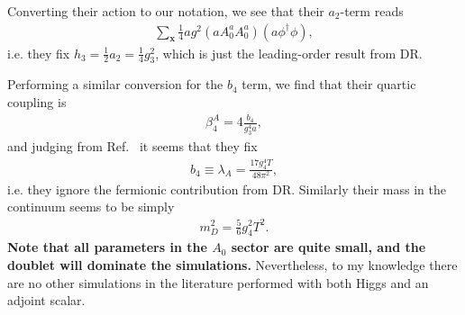 \documentclass[11pt,a4paper]{article}
\begin{document}
Converting their action to our notation, we see that their $a_2$-term reads 
\begin{align}
\sum_{\textbf{x}} \frac14 a g^2 (a A^a_0 A^a_0) (a \phi^\dagger\phi),
\end{align}
i.e. they fix $h_3 = \frac12 a_2 = \frac14 g_3^2$, which is just the leading-order result from DR.

Performing a similar conversion for the $b_4$ term, we find that their quartic coupling is
\begin{align*}
\beta^A_4 = 4 \frac{b_4}{g^4_3 a},
\end{align*}
and judging from Ref.~\cite{Farakos:1994kx} it seems that they fix 
\begin{align}
b_4 \equiv \lambda_A = \frac{17 g_4^4 T}{48\pi^2},
\end{align}
i.e. they ignore the fermionic contribution from DR. Similarly their mass in the continuum seems to be simply 
\begin{align}
m^2_D = \frac56 g^2_4 T^2. 
\end{align}
\textbf{Note that all parameters in the $A_0$ sector are quite small, and the doublet will dominate the simulations.} Nevertheless, to my knowledge there are no other simulations in the literature performed with both Higgs and an adjoint scalar.
\end{document}
